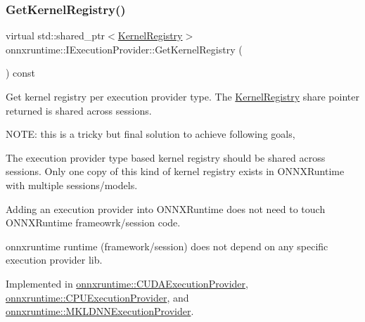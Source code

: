 \mbox{\label{classonnxruntime_1_1IExecutionProvider_a83caf9a8da9fcbc4e7fdc891055d664d}} 
\subsubsection{\texorpdfstring{Get\+Kernel\+Registry()}{GetKernelRegistry()}}
{\footnotesize\ttfamily virtual std\+::shared\+\_\+ptr$<$\mbox{\hyperlink{classonnxruntime_1_1KernelRegistry}{Kernel\+Registry}}$>$ onnxruntime\+::\+I\+Execution\+Provider\+::\+Get\+Kernel\+Registry (\begin{DoxyParamCaption}{ }\end{DoxyParamCaption}) const\hspace{0.3cm}{\ttfamily [pure virtual]}}

Get kernel registry per execution provider type. The \mbox{\hyperlink{classonnxruntime_1_1KernelRegistry}{Kernel\+Registry}} share pointer returned is shared across sessions.

N\+O\+TE\+: this is a tricky but final solution to achieve following goals,
\begin{DoxyEnumerate}
\item The execution provider type based kernel registry should be shared across sessions. Only one copy of this kind of kernel registry exists in O\+N\+N\+X\+Runtime with multiple sessions/models.
\item Adding an execution provider into O\+N\+N\+X\+Runtime does not need to touch O\+N\+N\+X\+Runtime frameowrk/session code.
\item onnxruntime runtime (framework/session) does not depend on any specific execution provider lib. 
\end{DoxyEnumerate}

Implemented in \mbox{\hyperlink{classonnxruntime_1_1CUDAExecutionProvider_a771c4dbe04b51b0c019e8b0e4648f61c}{onnxruntime\+::\+C\+U\+D\+A\+Execution\+Provider}}, \mbox{\hyperlink{classonnxruntime_1_1CPUExecutionProvider_a549e5e72c5c08a72a3e4a00b5e872f23}{onnxruntime\+::\+C\+P\+U\+Execution\+Provider}}, and \mbox{\hyperlink{classonnxruntime_1_1MKLDNNExecutionProvider_ad6f1e4b2ef0355a8f6b9c8fd866257ef}{onnxruntime\+::\+M\+K\+L\+D\+N\+N\+Execution\+Provider}}.

